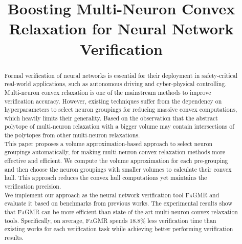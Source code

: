 \documentclass[runningheads]{llncs}
\newcommand{\ourtool}{\textsc{FaGMR}\xspace}
\begin{document}
%
\title{Boosting Multi-Neuron Convex Relaxation for Neural Network Verification
}
%
%
%
\maketitle              %
%
\begin{abstract}
Formal verification of neural networks is essential for their
deployment in safety-critical real-world applications, such as
autonomous driving and cyber-physical controlling. Multi-neuron convex
relaxation is one of the mainstream methods to improve verification accuracy.
However, existing techniques suffer from the dependency on hyperparameters to select neuron groupings for reducing massive convex 
computations, which heavily limits their generality.
Based on the observation that the abstract polytope of multi-neuron relaxation with a bigger volume
may contain intersections of the polytopes from other multi-neuron relaxations. \\
This paper proposes a volume approximation-based approach to select neuron groupings automatically, for making multi-neuron convex relaxation methods more effective and efficient. 
We compute the volume approximation for each pre-grouping 
and then choose the neuron groupings with smaller volumes
to calculate their convex hull.
This approach reduces the convex hull computations yet maintains the verification precision.\\
We implement our approach as the neural network verification tool \ourtool
and evaluate it based on benchmarks from previous works.
The experimental results show that \ourtool can be more efficient than
 state-of-the-art multi-neuron convex relaxation tools.
Specifically, on average, \ourtool spends 18.8\% less verification time than existing works for each
verification task  while achieving better performing verification results.

\end{abstract}
%
%
%
\end{document}
